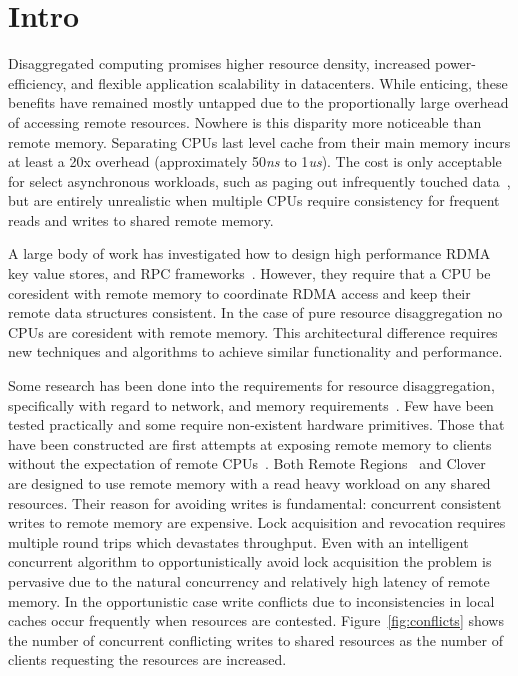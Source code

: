 \section{Intro}
\label{sec:intro}

Disaggregated computing promises higher resource density, increased
power-efficiency, and flexible application scalability in datacenters.
While enticing, these benefits have remained mostly untapped due to
the proportionally large overhead of accessing remote resources.
Nowhere is this disparity more noticeable than remote memory.
Separating CPUs last level cache from their main memory incurs at
least a 20x overhead (approximately 50\textit{ns} to 1\textit{us}).
The cost is only acceptable for select asynchronous workloads, such as
paging out infrequently touched data~\cite{infiniswap,legoos,leap},
but are entirely unrealistic when multiple CPUs require consistency
for frequent reads and writes to shared remote memory.

A large body of work has investigated how to design high performance
RDMA key value stores, and RPC
frameworks~\cite{cell,sonuma,storm,farm,herd,erpc}. However, they
require that a CPU be coresident with remote memory to coordinate RDMA
access and keep their remote data structures consistent. In the case
of pure resource disaggregation no CPUs are coresident with remote
memory. This architectural difference requires new techniques and
algorithms to achieve similar functionality and performance. 

Some research has been done into the requirements for resource
disaggregation, specifically with regard to network, and memory
requirements~\cite{requirements, aguilera2019designing, disandapp,
amanda-hotnets}. Few have been tested practically and some require
non-existent hardware primitives. Those that have been constructed are
first attempts at exposing remote memory to clients without the
expectation of remote CPUs~\cite{reigons, clover}. Both Remote
Regions~\cite{reigons} and Clover~\cite{clover} are designed to use
remote memory with a read heavy workload on any shared resources.
Their reason for avoiding writes is fundamental: concurrent consistent
writes to remote memory are expensive. Lock acquisition and revocation
requires multiple round trips which devastates throughput.  Even with
an intelligent concurrent algorithm to opportunistically avoid lock
acquisition the problem is pervasive due to the natural concurrency
and relatively high latency of remote memory.
In the opportunistic case write conflicts due to inconsistencies in
local caches occur frequently when resources are contested.
Figure~\ref{fig:conflicts} shows the number of concurrent conflicting
writes to shared resources as the number of clients requesting the
resources are increased.

